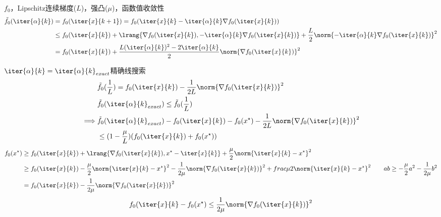$f_0$，Lipschitz连续梯度($L$)，强凸($\mu$)，函数值收敛性
\[\begin{aligned}
    \tilde{f}_0(\iter{\alpha}{k})&=f_0(\iter{x}{k+1})=f_0(\iter{x}{k}-\iter{\alpha}{k}\nabla f_0(\iter{x}{k}))\\
    &\leq f_0(\iter{x}{k})+\lrang{\nabla f_0(\iter{x}{k}),-\iter{\alpha}{k}\nabla f_0(\iter{x}{k})}+\frac{L}{2}\norm{-\iter{\alpha}{k}\nabla f_0(\iter{x}{k})}^2\\
    &=f_0(\iter{x}{k})+\frac{L(\iter{\alpha}{k})^2-2\iter{\alpha}{k}}{2}\norm{\nabla f_0(\iter{x}{k})}^2
\end{aligned}\]

$\iter{\alpha}{k}=\iter{\alpha}{k}_{exact}$精确线搜索
\[\begin{aligned}
    &\tilde{f}_0(\frac{1}{L})=f_0(\iter{x}{k})-\frac{1}{2L}\norm{\nabla f_0(\iter{x}{k})}^2\\
    &\tilde{f}_0(\iter{\alpha}{k}_{exact})\leq\tilde{f}_0(\frac{1}{L})\\
    \implies&\tilde{f}_0(\iter{\alpha}{k}_{exact})-f_0(\iter{x}{k})-f_0(x^\star)-\frac{1}{2L}\norm{\nabla f_0(\iter{x}{k})}^2\\
    &\leq (1-\frac{\mu}{L})(f_0(\iter{x}{k})+f_0(x^\star))
\end{aligned}\]
\[\begin{aligned}
    f_0(x^\star)&\geq f_0(\iter{x}{k})+\lrang{\nabla f_0(\iter{x}{k}),x^\star-\iter{x}{k}}+\frac{\mu}{2}\norm{\iter{x}{k}-x^\star}^2\\
    &\geq f_0(\iter{x}{k})-\frac{\mu}{2}\norm{\iter{x}{k}-x^\star}^2-\frac{1}{2\mu}\norm{\nabla f_0(\iter{x}{k})}^2+frac{\mu}{2}\norm{\iter{x}{k}-x^\star}^2\qquad ab\geq-\frac{\mu}{2}a^2-\frac{1}{2\mu}b^2\\
    &= f_0(\iter{x}{k})-\frac{1}{2\mu}\norm{\nabla f_0(\iter{x}{k})}^2
\end{aligned}\]
\[f_0(\iter{x}{k}-f_0(x^\star)\leq\frac{1}{2\mu}\norm{\nabla f_0(\iter{x}{k})}^2\]

